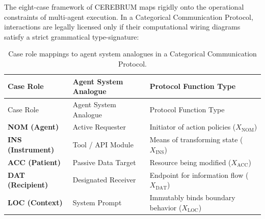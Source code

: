 \documentclass[
]{article}
\begin{document}
The eight-case framework of CEREBRUM \citep{friedman2024cerebrum} maps
rigidly onto the operational constraints of multi-agent execution. In a
Categorical Communication Protocol, interactions are legally licensed
only if their computational wiring diagrams satisfy a strict grammatical
type-signature:

\begin{longtable}[]{@{}
  >{\raggedright\arraybackslash}p{}
  >{\raggedright\arraybackslash}p{}
  >{\raggedright\arraybackslash}p{}@{}}
\caption{Case role mappings to agent system analogues in a Categorical
Communication Protocol.}\label{tbl:ai-case-roles}\tabularnewline
\toprule\noalign{}
\begin{minipage}[b]{\linewidth}\raggedright
Case Role
\end{minipage} & \begin{minipage}[b]{\linewidth}\raggedright
Agent System Analogue
\end{minipage} & \begin{minipage}[b]{\linewidth}\raggedright
Protocol Function Type
\end{minipage} \\
\midrule\noalign{}
\endfirsthead
\toprule\noalign{}
\begin{minipage}[b]{\linewidth}\raggedright
Case Role
\end{minipage} & \begin{minipage}[b]{\linewidth}\raggedright
Agent System Analogue
\end{minipage} & \begin{minipage}[b]{\linewidth}\raggedright
Protocol Function Type
\end{minipage} \\
\midrule\noalign{}
\endhead
\bottomrule\noalign{}
\endlastfoot
\textbf{NOM (Agent)} & Active Requester & Initiator of action policies
(\(X_{\text{NOM}}\)) \\
\textbf{INS (Instrument)} & Tool / API Module & Means of transforming
state (\(X_{\text{INS}}\)) \\
\textbf{ACC (Patient)} & Passive Data Target & Resource being modified
(\(X_{\text{ACC}}\)) \\
\textbf{DAT (Recipient)} & Designated Receiver & Endpoint for
information flow (\(X_{\text{DAT}}\)) \\
\textbf{LOC (Context)} & System Prompt & Immutably binds boundary
behavior (\(X_{\text{LOC}}\)) \\
\end{longtable}
\end{document}
